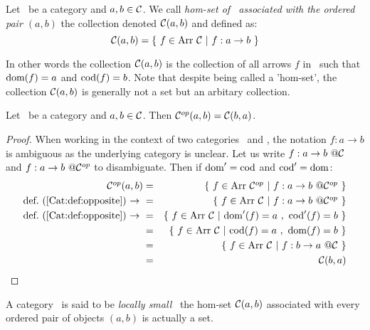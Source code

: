 \begin{defin}\label{Cat:def:homset}
    Let \Cat\ be a category and $a,b\in\mbox{$\cal C$}$. We call {\em hom-set of \Cat\ 
    associated with the ordered pair $(a,b)$} the collection denoted $\mbox{$\cal C$}(a,b)$ 
    and defined as:
        \[
            \Cat(a,b) = \{\ f\in\arr\ \Cat\ |\ f : a \to b\ \}
        \]
\end{defin}

\noindent
In other words the collection $\mbox{$\cal C$}(a,b)$ is the collection of all arrows $f$ in
\Cat\ such that $\mbox{\rm dom}(f)=a$ and $\mbox{\rm cod}(f)=b$. Note that despite being called a
'hom-set', the collection $\mbox{$\cal C$}(a,b)$ is generally not a set but an 
arbitary collection.

\begin{prop}\label{Cat:prop:homset:opposite}
    Let \Cat\ be a category and $a,b\in\mbox{$\cal C$}$. Then $\mbox{${\cal C}^{op}$}(a,b)=\mbox{$\cal C$}(b,a)$.
\end{prop}
\begin{proof}
    When working in the context of two categories \Cat\ and \Cop, the notation
    $f:a\to b$ is ambiguous as the underlying category is unclear. Let us
    write $f:a\to b\ @\mbox{$\cal C$}$ and $f:a\to b\ @\mbox{${\cal C}^{op}$}$ to disambiguate.
    Then if $\mbox{\rm dom}'=\mbox{\rm cod}$ and $\mbox{\rm cod}'=\mbox{\rm dom}$:
        \begin{eqnarray*}\Cop(a,b)
            &=&\{\ f\in\arr\ \Cop\ |\ f : a \to b\ @\Cop\ \}\\
            \mbox{def.~(\ref{Cat:def:opposite})\ $\to$\ }
            &=&\{\ f\in\arr\ \Cat\ |\ f : a \to b\ @\Cop\ \}\\
            \mbox{def.~(\ref{Cat:def:opposite})\ $\to$\ }
            &=&\{\ f\in\arr\ \Cat\ |\ \dom'(f)=a\ ,\ \cod'(f)=b\ \}\\
            &=&\{\ f\in\arr\ \Cat\ |\ \cod(f)=a\ ,\ \dom(f)=b\ \}\\
            &=&\{\ f\in\arr\ \Cat\ |\ f : b \to a\ @\Cat\ \}\\
            &=&\Cat(b,a)
        \end{eqnarray*}
\end{proof}

\begin{defin}\label{Cat:def:locally:small}
    A category \Cat\ is said to be {\em locally small} \ifand\ the hom-set
    $\mbox{$\cal C$}(a,b)$ associated with every ordered pair of objects $(a,b)$ is 
    actually a set.
\end{defin}
